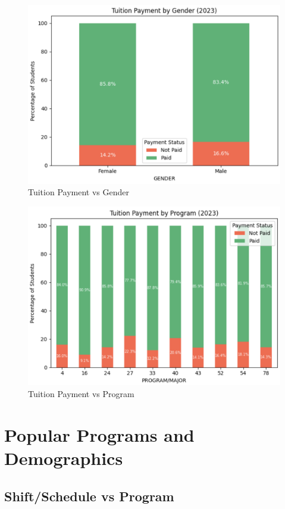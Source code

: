 \documentclass[12pt]{article}
\begin{document}
\begin{figure}[H]
    \centering
    \includegraphics[width=0.55\linewidth]{tuition_payment_gender.png}
    \caption{Tuition Payment vs Gender}
\end{figure}

\begin{figure}[H]
    \centering
    \includegraphics[width=0.55\linewidth]{tuition_payment_program.png}
    \caption{Tuition Payment vs Program}
\end{figure}

\section{Popular Programs and Demographics}

\subsection{Shift/Schedule vs Program}
\end{document}
